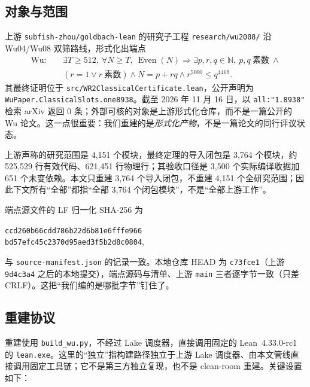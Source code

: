\documentclass[11pt,a4paper]{ctexart}
\theoremstyle{plain}
\theoremstyle{definition}
\newcommand{\WU}{\mathrm{Wu}}
\newcommand{\Even}{\operatorname{Even}}
\newcommand{\N}{\mathbb{N}}
\begin{document}
\subsection{对象与范围}
\label{sec:wu-object}

上游 \texttt{subfish-zhou/goldbach-lean} 的研究子工程 \texttt{research/wu2008/} 沿 Wu04/Wu08 双筛路线，形式化出端点
\begin{equation}
\begin{aligned}
\WU:\quad &\exists T\ge512,\ \forall N\ge T,\ \Even(N)\Longrightarrow
\exists p,r,q\in\N,\ p,q\ \text{素数}\ \land\\
&(r=1\lor r\ \text{素数})\land N=p+rq\land r^{5000}\le q^{4469}.
\end{aligned}
\label{eq:wu}
\end{equation}
其最终证明位于 \texttt{src/WR2ClassicalCertificate.lean}，公开声明为 \texttt{WuPaper.ClassicalSlots.one8938}。截至 2026 年 11 月 16 日，以 \texttt{all:"1.8938"} 检索 arXiv 返回 0 条；外部可核的对象是上游形式化仓库，而不是一篇公开的 Wu 论文。这一点很重要：我们重建的是\emph{形式化产物}，不是一篇论文的同行评议状态。

上游声称的研究范围是 4,151 个模块，最终定理的导入闭包是 3,764 个模块，约 525,529 行有效代码、621,451 行物理行；其验收口径是 3,500 个实际编译收据加 651 个未变依赖\cite{upstream}。本文只重建 3,764 个导入闭包，不重建 4,151 个全研究范围；因此下文所有“全部”都指“全部 3,764 个闭包模块”，不是“全部上游工作”。

端点源文件的 LF 归一化 SHA-256 为
\begin{center}
\texttt{ccd260b66cdd786b22d6b81e6fffe966\\bd57efc45c2370d95aed3f5b2d8c0804},
\end{center}
与 \texttt{source-manifest.json} 的记录一致。本地仓库 HEAD 为 \texttt{c73fce1}（上游 \texttt{9d4c3a4} 之后的本地提交），端点源码与清单、上游 \texttt{main} 三者逐字节一致（只差 CRLF）。这把“我们编的是哪批字节”钉住了。

\subsection{重建协议}
\label{sec:wu-protocol}

重建使用 \texttt{build\_wu.py}，不经过 Lake 调度器，直接调用固定的 Lean~4.33.0-rc1 的 \texttt{lean.exe}。这里的“独立”指构建路径独立于上游 Lake 调度器、由本文管线直接调用固定工具链；它不是第三方独立复现，也不是 clean-room 重建。关键设置如下：
\end{document}
